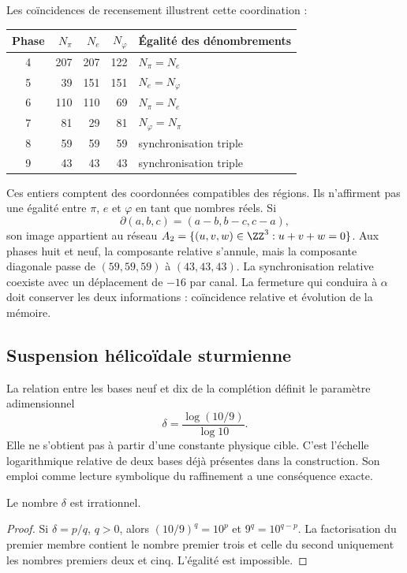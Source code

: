Les coïncidences de recensement illustrent cette coordination :
\begin{center}
\begin{tabular}{@{}c rrr l@{}}\toprule
Phase&\(N_\pi\)&\(N_e\)&\(N_\varphi\)&Égalité des dénombrements\\\midrule
4&207&207&122&\(N_\pi=N_e\)\\
5&39&151&151&\(N_e=N_\varphi\)\\
6&110&110&69&\(N_\pi=N_e\)\\
7&81&29&81&\(N_\varphi=N_\pi\)\\
8&59&59&59&synchronisation triple\\
9&43&43&43&synchronisation triple\\\bottomrule
\end{tabular}
\end{center}
Ces entiers comptent des coordonnées compatibles des régions. Ils n'affirment pas une égalité entre \(\pi\), \(e\) et \(\varphi\) en tant que nombres réels. Si
\[
 \partial(a,b,c)=(a-b,b-c,c-a),
\]
son image appartient au réseau \(A_2=\{(u,v,w)\in\ZZ^3:u+v+w=0\}\). Aux phases huit et neuf, la composante relative s'annule, mais la composante diagonale passe de \((59,59,59)\) à \((43,43,43)\). La synchronisation relative coexiste avec un déplacement de \(-16\) par canal. La fermeture qui conduira à \(\alpha\) doit conserver les deux informations : coïncidence relative et évolution de la mémoire.

\subsection{Suspension hélicoïdale sturmienne}

La relation entre les bases neuf et dix de la complétion définit le paramètre adimensionnel
\begin{equation}
 \delta=\frac{\log(10/9)}{\log10}.
 \label{x_reciprocidad:eq:delta-sturm}
\end{equation}
Elle ne s'obtient pas à partir d'une constante physique cible. C'est l'échelle logarithmique relative de deux bases déjà présentes dans la construction. Son emploi comme lecture symbolique du raffinement a une conséquence exacte.

\begin{lemma}
Le nombre \(\delta\) est irrationnel.
\end{lemma}
\begin{proof}
Si \(\delta=p/q\), \(q>0\), alors \((10/9)^q=10^p\) et \(9^q=10^{q-p}\). La factorisation du premier membre contient le nombre premier trois et celle du second uniquement les nombres premiers deux et cinq. L'égalité est impossible.
\end{proof}


